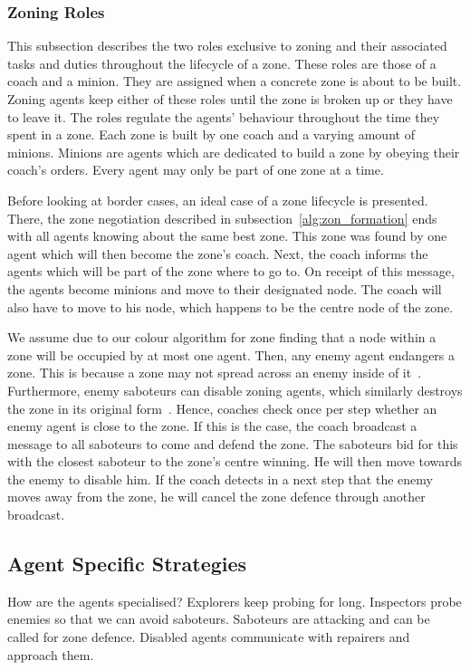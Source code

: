 \subsubsection{Zoning Roles}\label{alg:zon_roles}
This subsection describes the two roles exclusive to zoning and their associated tasks and duties throughout the lifecycle of a zone. These roles are those of a coach and a minion. They are assigned when a concrete zone is about to be built. Zoning agents keep either of these roles until the zone is broken up or they have to leave it. The roles regulate the agents' behaviour throughout the time they spent in a zone. Each zone is built by one coach and a varying amount of minions. Minions are agents which are dedicated to build a zone by obeying their coach's orders. Every agent may only be part of one zone at a time.

Before looking at border cases, an ideal case of a zone lifecycle is presented. There, the zone negotiation described in subsection~\ref{alg:zon_formation} ends with all agents knowing about the same best zone. This zone was found by one agent which will then become the zone's coach. Next, the coach informs the agents which will be part of the zone where to go to. On receipt of this message, the agents become minions and move to their designated node. The coach will also have to move to his node, which happens to be the centre node of the zone.

We assume due to our colour algorithm for zone finding that a node within a zone will be occupied by at most one agent. Then, any enemy agent endangers a zone. This is because a zone may not spread across an enemy inside of it~\cite{ahlbrecht_mapc_2014}. %
Furthermore, enemy saboteurs can disable zoning agents, which similarly destroys the zone in its original form~\cite{ahlbrecht_mapc_2014}. %
Hence, coaches check once per step whether an enemy agent is close to the zone. If this is the case, the coach broadcast a message to all saboteurs to come and defend the zone. The saboteurs bid for this with the closest saboteur to the zone's centre winning. He will then move towards the enemy to disable him. If the coach detects in a next step that the enemy moves away from the zone, he will cancel the zone defence through another broadcast.

\subsection{Agent Specific Strategies}
How are the agents specialised? Explorers keep probing for long. Inspectors probe enemies so that we can avoid saboteurs. Saboteurs are attacking and can be called for zone defence. Disabled agents communicate with repairers and approach them.

